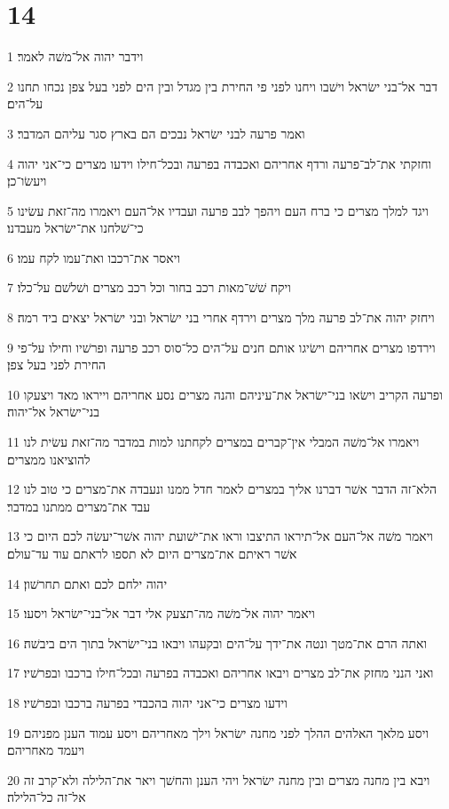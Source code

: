 \chapter{14}

\par 1 וידבר יהוה אל־משׁה לאמר׃
\par 2 דבר אל־בני ישׂראל וישׁבו ויחנו לפני פי החירת בין מגדל ובין הים לפני בעל צפן נכחו תחנו על־הים׃
\par 3 ואמר פרעה לבני ישׂראל נבכים הם בארץ סגר עליהם המדבר׃
\par 4 וחזקתי את־לב־פרעה ורדף אחריהם ואכבדה בפרעה ובכל־חילו וידעו מצרים כי־אני יהוה ויעשׂו־כן׃
\par 5 ויגד למלך מצרים כי ברח העם ויהפך לבב פרעה ועבדיו אל־העם ויאמרו מה־זאת עשׂינו כי־שׁלחנו את־ישׂראל מעבדנו׃
\par 6 ויאסר את־רכבו ואת־עמו לקח עמו׃
\par 7 ויקח שׁשׁ־מאות רכב בחור וכל רכב מצרים ושׁלשׁם על־כלו׃
\par 8 ויחזק יהוה את־לב פרעה מלך מצרים וירדף אחרי בני ישׂראל ובני ישׂראל יצאים ביד רמה׃
\par 9 וירדפו מצרים אחריהם וישׂיגו אותם חנים על־הים כל־סוס רכב פרעה ופרשׁיו וחילו על־פי החירת לפני בעל צפן׃
\par 10 ופרעה הקריב וישׂאו בני־ישׂראל את־עיניהם והנה מצרים נסע אחריהם וייראו מאד ויצעקו בני־ישׂראל אל־יהוה׃
\par 11 ויאמרו אל־משׁה המבלי אין־קברים במצרים לקחתנו למות במדבר מה־זאת עשׂית לנו להוציאנו ממצרים׃
\par 12 הלא־זה הדבר אשׁר דברנו אליך במצרים לאמר חדל ממנו ונעבדה את־מצרים כי טוב לנו עבד את־מצרים ממתנו במדבר׃
\par 13 ויאמר משׁה אל־העם אל־תיראו התיצבו וראו את־ישׁועת יהוה אשׁר־יעשׂה לכם היום כי אשׁר ראיתם את־מצרים היום לא תספו לראתם עוד עד־עולם׃
\par 14 יהוה ילחם לכם ואתם תחרשׁון׃
\par 15 ויאמר יהוה אל־משׁה מה־תצעק אלי דבר אל־בני־ישׂראל ויסעו׃
\par 16 ואתה הרם את־מטך ונטה את־ידך על־הים ובקעהו ויבאו בני־ישׂראל בתוך הים ביבשׁה׃
\par 17 ואני הנני מחזק את־לב מצרים ויבאו אחריהם ואכבדה בפרעה ובכל־חילו ברכבו ובפרשׁיו׃
\par 18 וידעו מצרים כי־אני יהוה בהכבדי בפרעה ברכבו ובפרשׁיו׃
\par 19 ויסע מלאך האלהים ההלך לפני מחנה ישׂראל וילך מאחריהם ויסע עמוד הענן מפניהם ויעמד מאחריהם׃
\par 20 ויבא בין מחנה מצרים ובין מחנה ישׂראל ויהי הענן והחשׁך ויאר את־הלילה ולא־קרב זה אל־זה כל־הלילה׃
